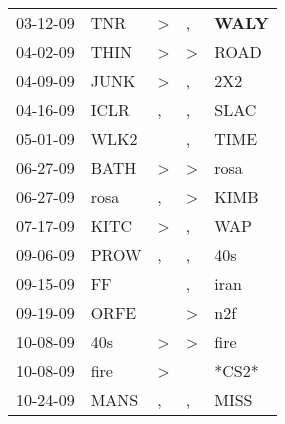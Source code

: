 \begin{supertabular}{p{0.07\textwidth}p{0.06\textwidth}p{0.02\textwidth}p{0.02\textwidth}p{0.06\textwidth}}
          03-12-09\textsuperscript{} &            TNR\textsuperscript{} &     \textgreater &                , &  \textbf{WALY\textsuperscript{}} \\
          04-02-09\textsuperscript{} &           THIN\textsuperscript{} &     \textgreater &     \textgreater &           ROAD\textsuperscript{} \\
          04-09-09\textsuperscript{} &           JUNK\textsuperscript{} &     \textgreater &                , &            2X2\textsuperscript{} \\
          04-16-09\textsuperscript{} &           ICLR\textsuperscript{} &                , &                , &           SLAC\textsuperscript{} \\
          05-01-09\textsuperscript{} &           WLK2\textsuperscript{} &                  &                , &           TIME\textsuperscript{} \\
          06-27-09\textsuperscript{} &           BATH\textsuperscript{} &     \textgreater &     \textgreater &           rosa\textsuperscript{} \\
          06-27-09\textsuperscript{} &           rosa\textsuperscript{} &                , &     \textgreater &           KIMB\textsuperscript{} \\
          07-17-09\textsuperscript{} &           KITC\textsuperscript{} &     \textgreater &                , &            WAP\textsuperscript{} \\
          09-06-09\textsuperscript{} &           PROW\textsuperscript{} &                , &                , &            40s\textsuperscript{} \\
          09-15-09\textsuperscript{} &             FF\textsuperscript{} &                  &                , &           iran\textsuperscript{} \\
          09-19-09\textsuperscript{} &           ORFE\textsuperscript{} &                  &     \textgreater &            n2f\textsuperscript{} \\
          10-08-09\textsuperscript{} &            40s\textsuperscript{} &     \textgreater &     \textgreater &           fire\textsuperscript{} \\
          10-08-09\textsuperscript{} &           fire\textsuperscript{} &     \textgreater &                  &                            *CS2* \\
          10-24-09\textsuperscript{} &           MANS\textsuperscript{} &                , &                , &           MISS\textsuperscript{} \\

\end{supertabular}

